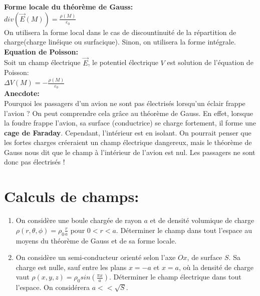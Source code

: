 \documentclass{article}
\begin{document}
\textbf{Forme locale du théorème de Gauss:}\\[0.1cm]

$div(\vec{E}(M)) = \frac{\rho(M)}{\varepsilon_0}$\\

On utilisera la forme local dans le cas de discountinuité de la répartition de charge(charge linéique ou surfacique). Sinon, on utilisera la forme intégrale.\\

\textbf{Equation de Poisson:}\\[0.1cm]

Soit un champ électrique $\vec{E}$, le potentiel électrique $V$ est solution de l'équation de Poisson:\\
$\Delta V (M) = -\frac{\rho(M)}{\varepsilon_0}$\\

\textbf{Anecdote:}\\[0.1cm]
Pourquoi les passagers d'un avion ne sont pas électrisés lorsqu'un éclair frappe l'avion ? 
On peut comprendre cela grâce au théorème de Gauss. 
En effet, lorsque la foudre frappe l'avion, sa surface (conductrice) se charge fortement, il forme une \textbf{cage de Faraday}.
Cependant, l'intérieur est en isolant. On pourrait penser que les fortes charges créeraient un champ électrique dangereux, mais le théorème de Gauss nous dit que le champ à l'intérieur de l'avion est nul. 
Les passagers ne sont donc pas électrisés !\\[0.1cm]

\section{Calculs de champs:  }

\begin{enumerate}
    \item On considère une boule chargée de rayon $a$ et de densité volumique de charge $\rho(r, \theta, \phi) = \rho_0 \frac{r}{a}$ pour $0<r<a$. Déterminer le champ dans tout l'espace au moyens du théorème de Gauss et de sa forme locale.\\
    \item On considère un semi-conducteur orienté selon l'axe $Ox$, de surface $S$. Sa charge est nulle, sauf entre les plans $x=-a$ et $x=a$, où la densité de charge vaut $\rho(x, y, z) = \rho_0 sin(\frac{\pi x}{a})$. Déterminer le champ électrique dans tout l'espace. On considérera $a<<\sqrt{S}$. 
\end{enumerate}
\end{document}
